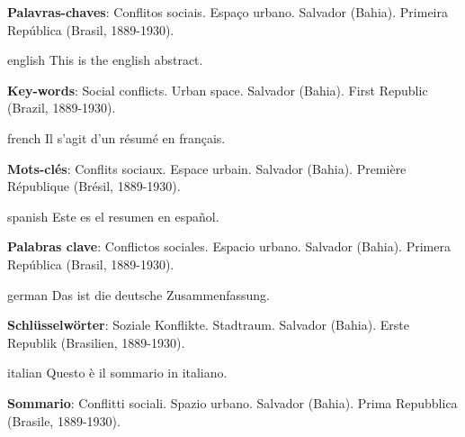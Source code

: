 
\setlength{\absparsep}{18pt} %
\begin{resumo}
 

 \textbf{Palavras-chaves}: Conflitos sociais. Espaço urbano. Salvador (Bahia). Primeira República (Brasil, 1889-1930).
\end{resumo}

\begin{resumo}[Abstract]
 \begin{otherlanguage*}{english}
   This is the english abstract.

   \vspace{\onelineskip}
 
   \noindent 
   \textbf{Key-words}: Social conflicts. Urban space. Salvador (Bahia). First Republic (Brazil, 1889-1930).
 \end{otherlanguage*}
\end{resumo}

\begin{resumo}[Résumé]
 \begin{otherlanguage*}{french}
    Il s'agit d'un résumé en français.
 
   \textbf{Mots-clés}: Conflits sociaux. Espace urbain. Salvador (Bahia). Première République (Brésil, 1889-1930).
 \end{otherlanguage*}
\end{resumo}

\begin{resumo}[Resumen]
 \begin{otherlanguage*}{spanish}
   Este es el resumen en español.
  
   \textbf{Palabras clave}: Conflictos sociales. Espacio urbano. Salvador (Bahia). Primera República (Brasil, 1889-1930).
 \end{otherlanguage*}
\end{resumo}

\begin{resumo}[Zusammenfassung]
 \begin{otherlanguage*}{german}
   Das ist die deutsche Zusammenfassung.
  
   \textbf{Schlüsselwörter}: Soziale Konflikte. Stadtraum. Salvador (Bahia). Erste Republik (Brasilien, 1889-1930).
 \end{otherlanguage*}
\end{resumo}

\begin{resumo}[Sommario]
 \begin{otherlanguage*}{italian}
   Questo è il sommario in italiano.
  
   \textbf{Sommario}: Conflitti sociali. Spazio urbano. Salvador (Bahia). Prima Repubblica (Brasile, 1889-1930).
 \end{otherlanguage*}
\end{resumo}
